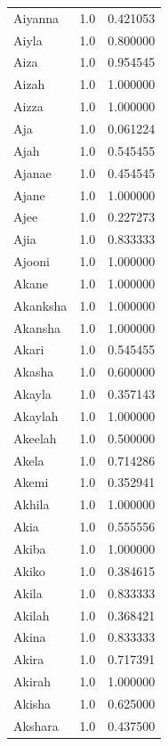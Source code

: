 \documentclass[
  letterpaper,
  DIV=11,
  numbers=noendperiod]{scrreprt}
\begin{document}
\begin{tabular}{lrr}
Aiyanna         &   1.0 &   0.421053 \\
Aiyla           &   1.0 &   0.800000 \\
Aiza            &   1.0 &   0.954545 \\
Aizah           &   1.0 &   1.000000 \\
Aizza           &   1.0 &   1.000000 \\
Aja             &   1.0 &   0.061224 \\
Ajah            &   1.0 &   0.545455 \\
Ajanae          &   1.0 &   0.454545 \\
Ajane           &   1.0 &   1.000000 \\
Ajee            &   1.0 &   0.227273 \\
Ajia            &   1.0 &   0.833333 \\
Ajooni          &   1.0 &   1.000000 \\
Akane           &   1.0 &   1.000000 \\
Akanksha        &   1.0 &   1.000000 \\
Akansha         &   1.0 &   1.000000 \\
Akari           &   1.0 &   0.545455 \\
Akasha          &   1.0 &   0.600000 \\
Akayla          &   1.0 &   0.357143 \\
Akaylah         &   1.0 &   1.000000 \\
Akeelah         &   1.0 &   0.500000 \\
Akela           &   1.0 &   0.714286 \\
Akemi           &   1.0 &   0.352941 \\
Akhila          &   1.0 &   1.000000 \\
Akia            &   1.0 &   0.555556 \\
Akiba           &   1.0 &   1.000000 \\
Akiko           &   1.0 &   0.384615 \\
Akila           &   1.0 &   0.833333 \\
Akilah          &   1.0 &   0.368421 \\
Akina           &   1.0 &   0.833333 \\
Akira           &   1.0 &   0.717391 \\
Akirah          &   1.0 &   1.000000 \\
Akisha          &   1.0 &   0.625000 \\
Akshara         &   1.0 &   0.437500 \\

\end{tabular}
\end{document}
